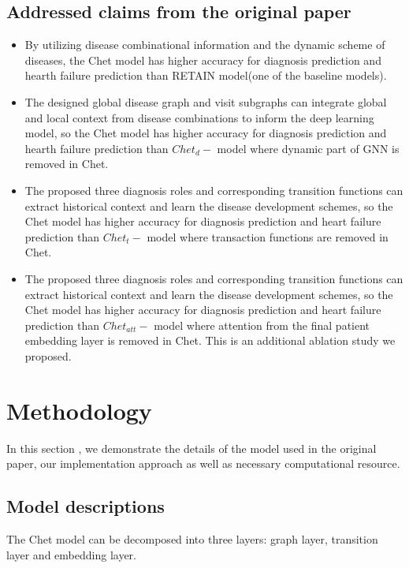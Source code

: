 \documentclass[11pt,a4paper,fleqn]{article}
\begin{document}
\subsection{Addressed claims from the original paper}
\begin{itemize}
    \item By utilizing disease combinational information and the dynamic scheme of diseases, the Chet model has higher accuracy for diagnosis prediction and hearth failure prediction than RETAIN model(one of the baseline models). 
    \item The designed global disease graph and visit subgraphs can integrate global and local context from disease combinations to inform the deep learning model, so the Chet model has higher accuracy for diagnosis prediction and hearth failure prediction than $Chet_d-$ model where dynamic part of GNN is removed in Chet.
    \item The proposed three diagnosis roles and corresponding transition functions can extract historical context and learn the disease development schemes, so the Chet model has higher accuracy for diagnosis prediction and heart failure prediction than $Chet_t-$ model where transaction functions are removed in Chet.
    \item  The proposed three diagnosis roles and corresponding transition functions can extract historical context and learn the disease development schemes, so the Chet model has higher accuracy for diagnosis prediction and heart failure prediction than $Chet_{att}-$ model where attention from the final patient embedding layer is removed in Chet. This is an additional ablation study we proposed.
\end{itemize}

\section{Methodology}
In this section , we demonstrate the details of the model used in the original paper, our implementation approach as well as necessary computational resource.
\subsection{Model descriptions}
The Chet model can be decomposed into three layers: graph layer, transition layer and embedding layer.
\end{document}

